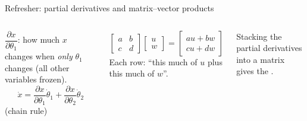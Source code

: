\documentclass[aspectratio=169,10pt]{beamer}
\begin{document}
\begin{frame}[t]{Refresher: partial derivatives and matrix--vector products}
\begin{columns}[T,onlytextwidth]
\begin{defbox}
$\dfrac{\partial x}{\partial\theta_1}$: how much $x$ changes when \emph{only} $\theta_1$ changes (all other variables frozen).
\[ \dot x = \frac{\partial x}{\partial\theta_1}\dot\theta_1 + \frac{\partial x}{\partial\theta_2}\dot\theta_2 \]
(chain rule)
\end{defbox}
\begin{defbox}
\[ \begin{bmatrix} a & b\\ c & d\end{bmatrix}\begin{bmatrix} u\\ w\end{bmatrix} = \begin{bmatrix} au+bw\\ cu+dw\end{bmatrix} \]
Each row: ``this much of $u$ plus this much of $w$''.
\end{defbox}
\begin{notebox}
Stacking the partial derivatives into a matrix gives the .
\end{notebox}
\end{columns}
\end{frame}
\end{document}
